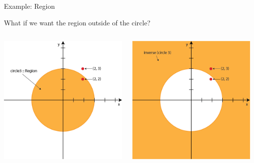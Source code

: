 \documentclass[8pt,aspectratio=169]{beamer}
\begin{document}
\begin{frame}[fragile]{Example: Region}

What if we want the region outside of the circle?

\begin{columns}[onlytextwidth]
\begin{column}{0.5\textwidth}
\pause
\begin{center}
\includegraphics[scale=0.22]{figures/region}
\end{center}
\end{column}
\begin{column}{0.5\textwidth}
\pause
\begin{center}
\includegraphics[scale=0.22]{figures/invertedRegion}
\end{center}
\end{column}
\end{columns}


\end{frame}
\end{document}
